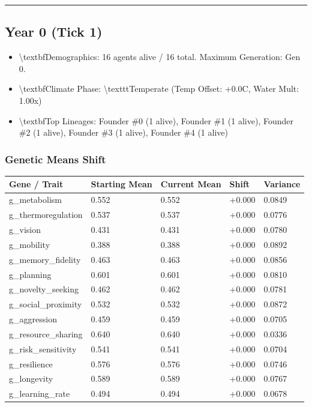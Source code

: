 \documentclass[11pt,a4paper]{article}
\begin{document}
\noindent\rule{\textwidth}{0.4pt}

\subsection*{ Year 0 (Tick 1)}
\begin{itemize}
  \item \textbackslash{}textbf{Demographics:} 16 agents alive / 16 total. Maximum Generation: Gen 0.
  \item \textbackslash{}textbf{Climate Phase:} \textbackslash{}texttt{Temperate} (Temp Offset: +0.0C, Water Mult: 1.00x)
  \item \textbackslash{}textbf{Top Lineages:} Founder \#0 (1 alive), Founder \#1 (1 alive), Founder \#2 (1 alive), Founder \#3 (1 alive), Founder \#4 (1 alive)
\end{itemize}

\subsubsection*{ Genetic Means Shift}
\begin{longtable}{lllll}
\toprule
Gene / Trait & Starting Mean & Current Mean & Shift & Variance \\
\midrule
\endhead
g\_metabolism & 0.552 & 0.552 & +0.000 & 0.0849 \\
g\_thermoregulation & 0.537 & 0.537 & +0.000 & 0.0776 \\
g\_vision & 0.431 & 0.431 & +0.000 & 0.0780 \\
g\_mobility & 0.388 & 0.388 & +0.000 & 0.0892 \\
g\_memory\_fidelity & 0.463 & 0.463 & +0.000 & 0.0856 \\
g\_planning & 0.601 & 0.601 & +0.000 & 0.0810 \\
g\_novelty\_seeking & 0.462 & 0.462 & +0.000 & 0.0781 \\
g\_social\_proximity & 0.532 & 0.532 & +0.000 & 0.0872 \\
g\_aggression & 0.459 & 0.459 & +0.000 & 0.0705 \\
g\_resource\_sharing & 0.640 & 0.640 & +0.000 & 0.0336 \\
g\_risk\_sensitivity & 0.541 & 0.541 & +0.000 & 0.0704 \\
g\_resilience & 0.576 & 0.576 & +0.000 & 0.0746 \\
g\_longevity & 0.589 & 0.589 & +0.000 & 0.0767 \\
g\_learning\_rate & 0.494 & 0.494 & +0.000 & 0.0678 \\
\bottomrule
\end{longtable}
\end{document}

